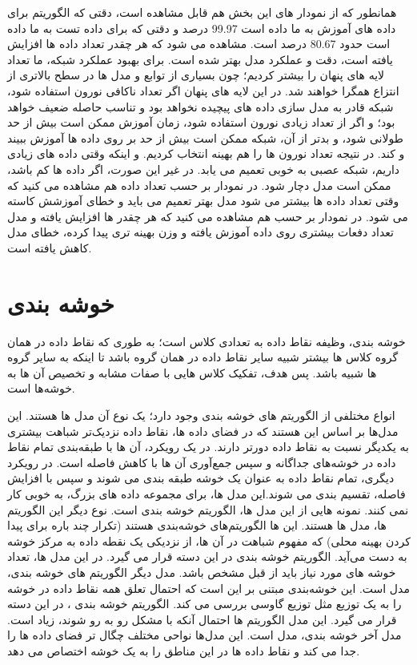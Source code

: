 \documentclass[12pt,onecolumn,a4paper]{article}
\begin{document}
همانطور که از نمودار های این بخش هم قابل مشاهده است، دقتی که الگوریتم  برای داده های آموزش به ما داده است 99.97 درصد و دقتی که برای داده تست به ما داده است حدود 80.67 درصد است. مشاهده می شود که هر چقدر تعداد داده ها افزایش یافته است، دقت و عملکرد مدل بهتر شده است. برای بهبود عملکرد شبکه، ما تعداد لایه های پنهان را بیشتر کردیم؛ چون بسیاری از توابع و مدل ها در سطح بالاتری از انتزاع همگرا خواهند شد. در این لایه های پنهان اگر تعداد ناکافی نورون استفاده شود، شبکه قادر به مدل سازی داده های پیچیده نخواهد بود و تناسب حاصله ضعیف خواهد بود؛ و اگر از تعداد زیادی نورون استفاده شود، زمان آموزش ممکن است بیش از حد طولانی شود، و بدتر از آن، شبکه ممکن است بیش از حد بر روی داده ها آموزش ببیند و  کند. در نتیجه تعداد نورون ها را هم بهینه انتخاب کردیم. و اینکه وقتی داده های زیادی داریم، شبکه عصبی به خوبی تعمیم می یابد. در غیر این صورت، اگر داده ها کم باشد، ممکن است مدل دچار  شود. در نمودار  بر حسب تعداد داده هم مشاهده می کنید که وقتی تعداد داده ها بیشتر می شود مدل بهتر تعمیم می باید و خطای آموزشش کاسته می شود. در نمودار  بر حسب  هم مشاهده می کنید که هر چقدر  ها افزایش یافته و مدل تعداد دفعات بیشتری روی داده آموزش یافته و وزن بهینه تری پیدا کرده، خطای مدل کاهش یافته است.

\section{خوشه بندی}
خوشه بندی، وظیفه نقاط داده به تعدادی کلاس است؛ به طوری که نقاط داده در همان گروه کلاس ها بیشتر شبیه سایر نقاط داده در همان گروه باشد تا اینکه به سایر گروه ها شبیه باشد. پس هدف، تفکیک کلاس هایی با صفات مشابه و تخصیص آن ها به خوشه‌ها است.

انواع مختلفی از الگوریتم های خوشه بندی وجود دارد؛ یک نوع آن  مدل ها هستند. این مدل‌ها بر اساس این هستند که در فضای داده ها، نقاط داده نزدیک‌تر شباهت بیشتری به یکدیگر نسبت به نقاط داده دورتر دارند. در یک رویکرد، آن ها با طبقه‌بندی تمام نقاط داده در خوشه‌های جداگانه و سپس جمع‌آوری آن ها با کاهش فاصله است. در رویکرد دیگری، تمام نقاط داده به عنوان یک خوشه طبقه بندی می شوند و سپس با افزایش فاصله، تقسیم بندی می شوند.این مدل ها، برای مجموعه داده های بزرگ، به خوبی کار نمی کنند. نمونه هایی از این مدل ها، الگوریتم خوشه بندی  است. نوع دیگر این الگوریتم ها،  مدل ها هستند. این ها الگوریتم‌های خوشه‌بندی  هستند (تکرار چند باره برای پیدا کردن بهینه محلی) که مفهوم شباهت در آن ها، از نزدیکی یک نقطه داده به مرکز خوشه‌ به دست می‌آید. الگوریتم خوشه بندی  در این دسته قرار می گیرد. در این مدل ها، تعداد خوشه های مورد نیاز باید از قبل مشخص باشد. مدل دیگر الگوریتم های خوشه بندی، مدل  است. این خوشه‌بندی مبتنی بر این است که احتمال تعلق همه نقاط داده در خوشه را به یک توزیع مثل توزیع گاوسی بررسی می کند. الگوریتم خوشه بندی ، در این دسته قرار می گیرد. این مدل الگوریتم ها احتمال آنکه با مشکل  رو به رو شوند، زیاد است. مدل آخر خوشه بندی، مدل  است. این مدل‌ها نواحی مختلف چگال تر فضای داده ها را جدا می کند و نقاط داده ها در این مناطق را به یک خوشه اختصاص می دهد.
\end{document}
